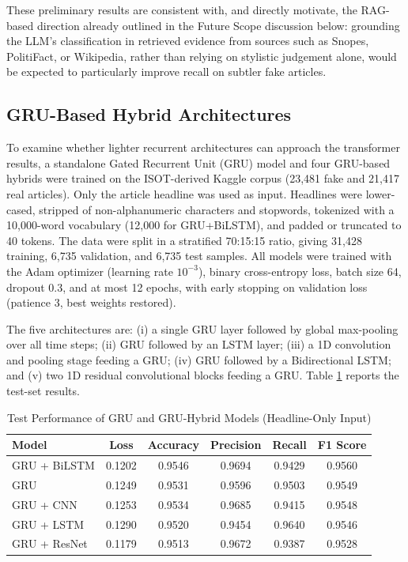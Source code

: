 \documentclass[runningheads]{llncs}
\begin{document}
These preliminary results are consistent with, and directly motivate, the RAG-based direction already outlined in the Future Scope discussion below: grounding the LLM's classification in retrieved evidence from sources such as Snopes, PolitiFact, or Wikipedia, rather than relying on stylistic judgement alone, would be expected to particularly improve recall on subtler fake articles.

\subsection{GRU-Based Hybrid Architectures}

To examine whether lighter recurrent architectures can approach the transformer results, a standalone Gated Recurrent Unit (GRU) model and four GRU-based hybrids were trained on the ISOT-derived Kaggle corpus (23,481 fake and 21,417 real articles). Only the article headline was used as input. Headlines were lower-cased, stripped of non-alphanumeric characters and stopwords, tokenized with a 10,000-word vocabulary (12,000 for GRU+BiLSTM), and padded or truncated to 40 tokens. The data were split in a stratified 70:15:15 ratio, giving 31,428 training, 6,735 validation, and 6,735 test samples. All models were trained with the Adam optimizer (learning rate $10^{-3}$), binary cross-entropy loss, batch size 64, dropout 0.3, and at most 12 epochs, with early stopping on validation loss (patience 3, best weights restored).

The five architectures are: (i) a single GRU layer followed by global max-pooling over all time steps; (ii) GRU followed by an LSTM layer; (iii) a 1D convolution and pooling stage feeding a GRU; (iv) GRU followed by a Bidirectional LSTM; and (v) two 1D residual convolutional blocks feeding a GRU. Table \ref{tab:gru-comparison} reports the test-set results.

\begin{table}[H]
\centering
\caption{Test Performance of GRU and GRU-Hybrid Models (Headline-Only Input)}
\label{tab:gru-comparison}
\small
\begin{tabular}{|l|c|c|c|c|c|}
\hline
\textbf{Model} & \textbf{Loss} & \textbf{Accuracy} & \textbf{Precision} & \textbf{Recall} & \textbf{F1 Score} \\ \hline
GRU + BiLSTM & 0.1202 & 0.9546 & 0.9694 & 0.9429 & 0.9560 \\
GRU & 0.1249 & 0.9531 & 0.9596 & 0.9503 & 0.9549 \\
GRU + CNN & 0.1253 & 0.9534 & 0.9685 & 0.9415 & 0.9548 \\
GRU + LSTM & 0.1290 & 0.9520 & 0.9454 & 0.9640 & 0.9546 \\
GRU + ResNet & 0.1179 & 0.9513 & 0.9672 & 0.9387 & 0.9528 \\ \hline
\end{tabular}
\end{table}
\end{document}

